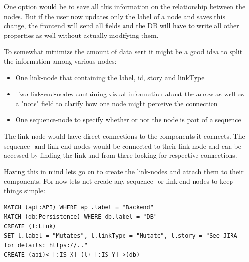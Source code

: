 One option would be to save all this information on the relationship between the nodes. But if the user now updates only the label of a node and saves this change, the frontend will send all fields and the DB will have to write all other properties as well without actually modifying them.

To somewhat minimize the amount of data sent it might be a good idea to split the information among various nodes:
\begin{itemize}
\item One link-node that containing the label, id, story and linkType
\item Two link-end-nodes containing visual information about the arrow as well as a "note" field to clarify how one node might perceive the connection
\item One sequence-node to specify whether or not the node is part of a sequence
\end{itemize}

The link-node would have direct connections to the components it connects. The sequence- and link-end-nodes would be connected to their link-node and can be accessed by finding the link and from there looking for respective connections.

Having this in mind lets go on to create the link-nodes and attach them to their components. For now lets not create any sequence- or link-end-nodes to keep things simple:

\begin{lstlisting}[caption={Creating and Connecting the First Link}]
MATCH (api:API) WHERE api.label = "Backend"
MATCH (db:Persistence) WHERE db.label = "DB"
CREATE (l:Link)
SET l.label = "Mutates", l.linkType = "Mutate", l.story = "See JIRA for details: https://.."
CREATE (api)<-[:IS_X]-(l)-[:IS_Y]->(db)
\end{lstlisting}

